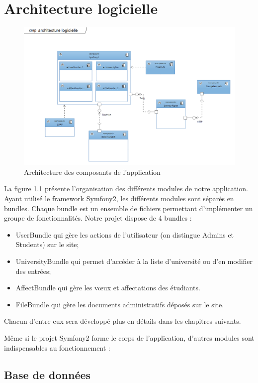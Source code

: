 \chapter{Architecture logicielle}

\begin{figure}
	\includegraphics[scale=0.8,angle=90]{images/archilogi.png}
	\caption{Architecture des composants de l'application}
	\label{archilogi}
\end{figure}

La figure \ref{archilogi} présente l'organisation des différents modules de notre application. 
\bigbreak
Ayant utilisé le framework Symfony2, les différents modules sont séparés en bundles. Chaque bundle est un ensemble de fichiers permettant d'implémenter un groupe de fonctionnalités. Notre projet dispose de 4 bundles :
\begin{itemize}
	\item UserBundle qui gère les actions de l'utilisateur (on distingue Admins et Students) sur le site;
	\item UniversityBundle qui permet d'accéder à la liste d'université ou d'en modifier des entrées;
	\item AffectBundle qui gère les vœux et affectations des étudiants.
	\item FileBundle qui gère les documents administratifs déposés sur le site.
\end{itemize}
Chacun d'entre eux sera développé plus en détails dans les chapitres suivants.
\bigbreak

Même si le projet Symfony2 forme le corps de l'application,  d'autres modules sont indispensables au fonctionnement :
 
\section{Base de données}

